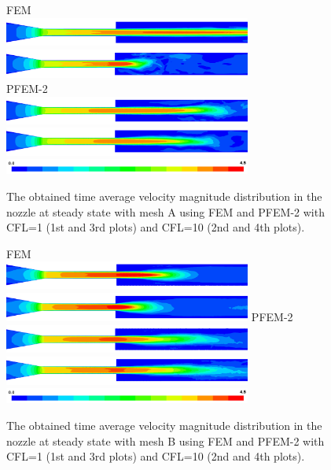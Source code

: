 \begin{figure}[htbp]
    \centering
    FEM\\
    \includegraphics[width=3.2in]{imgs/nozzle_pump/nozzle_fem_fm_cfl1.png}
    \includegraphics[width=3.2in]{imgs/nozzle_pump/nozzle_fem_fm_cfl5.png}\\
    PFEM-2\\
    \includegraphics[width=3.2in]{imgs/nozzle_pump/nozzle_pfem_fm_cfl1.png}
    \includegraphics[width=3.2in]{imgs/nozzle_pump/nozzle_pfem_fm_cfl5.png}
    \includegraphics[width=3.2in]{imgs/nozzle_pump/nozzle_legend.png}
    \caption{The obtained time average velocity magnitude distribution in the nozzle at steady state with mesh A using FEM and PFEM-2 with CFL=1 (1st and 3rd plots) and CFL=10 (2nd and 4th plots). }
    \label{fig:nozzlevelfm}
\end{figure}

\begin{figure}[htbp]
    \centering
    FEM\\
    \includegraphics[width=3.2in]{imgs/nozzle_pump/nozzle_fem_pm_cfl1.png}
    \includegraphics[width=3.2in]{imgs/nozzle_pump/nozzle_fem_pm_cfl10.png}
    PFEM-2\\
    \includegraphics[width=3.2in]{imgs/nozzle_pump/nozzle_pfem_pm_cfl1.png}
    \includegraphics[width=3.2in]{imgs/nozzle_pump/nozzle_pfem_pm_cfl10.png}
    \includegraphics[width=3.2in]{imgs/nozzle_pump/nozzle_legend.png}
    \caption{The obtained time average velocity magnitude distribution in the nozzle at steady state with mesh B using FEM and PFEM-2 with CFL=1 (1st and 3rd plots) and CFL=10 (2nd and 4th plots).}
    \label{fig:nozzlevelpm}
\end{figure}


